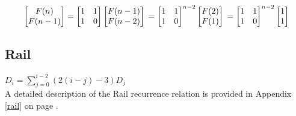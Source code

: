 $$ \begin{bmatrix}
        F(n)\\F(n-1)
    \end{bmatrix} =
    \begin{bmatrix}
        1 & 1\\
        1 & 0
    \end{bmatrix}
    \begin{bmatrix}
        F(n - 1)\\
        F(n - 2)
    \end{bmatrix}\\
    = 
    \begin{bmatrix}
        1 & 1\\
        1 & 0
    \end{bmatrix}^{n - 2}
    \begin{bmatrix}
        F(2)\\
        F(1)
    \end{bmatrix}\\
    =
    \begin{bmatrix}
        1 & 1\\
        1 & 0
    \end{bmatrix}^{n - 2}
    \begin{bmatrix}
        1\\
        1
    \end{bmatrix}
$$

\subsection{Rail} $D_i = \sum\limits_{j = 0}^{i - 2}(2(i - j) - 3)D_j$\\

A detailed description of the Rail recurrence relation is provided in Appendix \ref{rail} on page \pageref{rail}.


